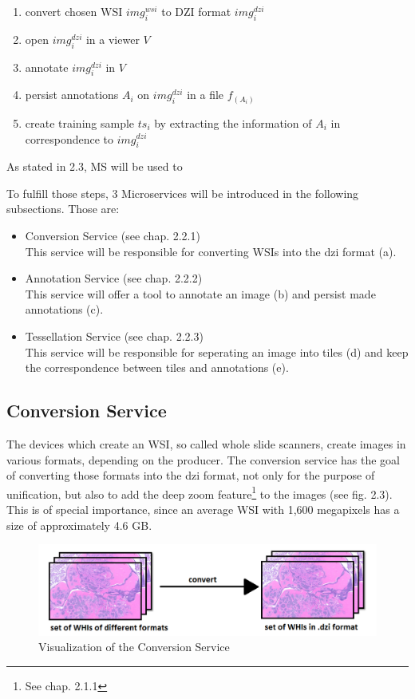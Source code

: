 \begin{enumerate}[(1.)]
	\item convert chosen WSI $img^{wsi}_i$ to DZI format $img^{dzi}_i$
	\item open $img^{dzi}_i$ in a viewer $V$
	\item annotate $img^{dzi}_i$ in $V$
	\item persist annotations $A_i$ on $img^{dzi}_i$ in a file $f_{(A_i)}$
	\item create training sample $ts_i$ by extracting the information of $A_i$ in correspondence to $img^{dzi}_i$
\end{enumerate}

As stated in 2.3, MS will be used to 


To fulfill those steps, 3 Microservices will be introduced in the following subsections. Those are:

\begin{itemize}
	\item Conversion Service (see chap. 2.2.1)\\
	This service will be responsible for converting WSIs into the dzi format (a).
	\item Annotation Service (see chap. 2.2.2)\\
	This service will offer a tool to annotate an image (b) and persist made annotations (c).
	\item Tessellation Service (see chap. 2.2.3)\\
	This service will be responsible for seperating an image into tiles (d) and keep the correspondence between tiles and annotations (e).
\end{itemize}


\subsection{Conversion Service}

The devices which create an WSI, so called whole slide scanners, create images in various formats, depending on the producer. The conversion service has the goal of converting those formats into the dzi format, not only for the purpose of unification, but also to add the deep zoom feature\footnote{See chap. 2.1.1} to the images (see fig. 2.3). This is of special importance, since an average WSI with 1,600 megapixels has a size of approximately 4.6 GB\cite{Farahanil15}.

\begin{figure}[H]
	\begin{center}
		\includegraphics[scale=0.35]{img/processChainA.png}
		\caption{Visualization of the Conversion Service}
		\label{fig:fig2.3}
	\end{center}
\end{figure}

